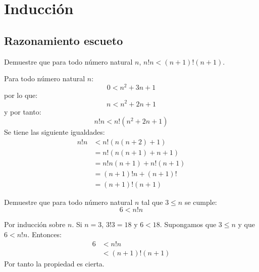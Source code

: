 \section{Inducción}

\subsection{Razonamiento escueto}

\begin{exercise}
  \label{ex:monotonia}
  Demuestre que para todo número natural $n$, $n!n<(n+1)!(n+1)$.
\end{exercise}

\begin{solution}
  Para todo número natural $n$:
  \begin{equation*}
    0<n^{2}+3n+1
  \end{equation*}
  por lo que:
  \begin{equation*}
    n<n^{2}+2n+1
  \end{equation*}
  y por tanto:
  \begin{equation*}
    n!n<n!(n^{2}+2n+1)
  \end{equation*}
  Se tiene las siguiente igualdades:
  \begin{align*}
    n!n&<n!(n(n+2)+1)\\
       &=n!(n(n+1)+n+1)\\
       &=n!n(n+1)+n!(n+1)\\
       &=(n+1)!n+(n+1)!\\
       &=(n+1)!(n+1)
  \end{align*}
\end{solution}

\begin{exercise}
  Demuestre que para todo número natural $n$ tal que $3\leq n$ se
  cumple:
  \begin{equation*}
    6<n!n
  \end{equation*}
\end{exercise}

\begin{solution}
  Por inducción sobre $n$. Si $n=3$, $3!3=18$ y $6<18$. Supongamos que
  $3\leq n$ y que $6<n!n$. Entonces:
  \begin{align*}
    6&<n!n\\
     &<(n+1)!(n+1)
  \end{align*}
  Por tanto la propiedad es cierta.
\end{solution}

